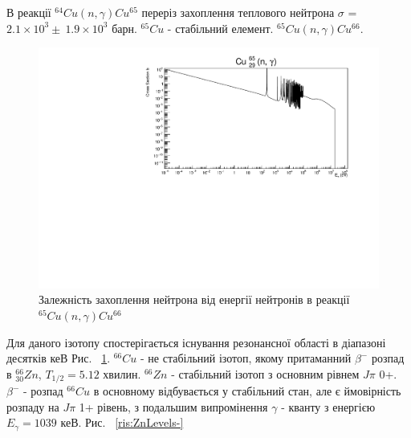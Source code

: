 \documentclass[a4paper, 14pt]{article}
\numberwithin{equation}{section}
\numberwithin{table}{section}
\begin{document}
В реакції $^{64}Cu(n, \gamma)Cu^{65}$ переріз захоплення теплового нейтрона $\sigma$ = $2.1 \times 10^3 \pm \ 1.9 \times 10^3$ барн. $^{65}Cu$ - стабільний елемент. $^{65}Cu(n,\gamma)Cu^{66}$.
\begin{figure}[hbt!]
	\centering \includegraphics[width=1\textwidth]{sigma/Cu65Sigma.pdf}
	\caption{Залежність захоплення нейтрона від енергії нейтронів в реакції $^{65}Cu(n,\gamma)Cu^{66}$} 
	\label{ris:CuSigma}	
\end{figure} 
Для даного ізотопу спостерігається існування резонансної області в діапазоні десятків кеВ Рис. ~\ref{ris:CuSigma}. 
$^{66}Cu$ - не стабільний ізотоп, якому притаманний $\beta^-$ розпад в $^{66}_{30}Zn$, $T_{1/2} = 5.12$ хвилин. 
$^{66}Zn$ - стабільний ізотоп з основним рівнем $J\pi$ 0+. $\beta^-$ - розпад $^{66}Cu$ в основному відбувається у стабільний стан, але є ймовірність розпаду на $J\pi$ 1+ рівень, з подальшим випромінення $\gamma$ - кванту з енергією $E_{\gamma} = 1039$ кеВ. Рис. ~\ref{ris:ZnLevels-}
\\
\end{document}
